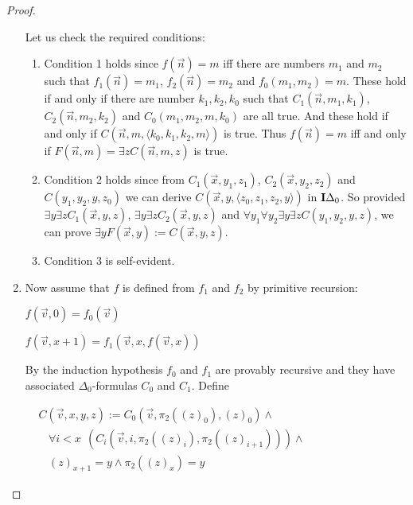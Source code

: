 \documentclass[8pt]{article}
\theoremstyle{definition}
\theoremstyle{definition}
\theoremstyle{definition}
\theoremstyle{definition}
\theoremstyle{definition}
\theoremstyle{definition}
\theoremstyle{definition}
\theoremstyle{definition}
\theoremstyle{definition}
\theoremstyle{definition}
\theoremstyle{definition}
\theoremstyle{definition}
\theoremstyle{definition}
\theoremstyle{question}
\begin{document}
\begin{proof}
\begin{enumerate}
    Let us check the required conditions:
    \begin{enumerate}
      \item Condition 1 holds since $f(\vec{n}) = m$ iff there are numbers $m_1$ and $m_2$ such that
      $f_1(\vec{n}) = m_1$, $f_2(\vec{n}) = m_2$ and $f_0(m_1, m_2) = m$.
      These hold if and only if there are number $k_1, k_2, k_0$ such that 
      $C_1(\vec{n}, m_1, k_1)$, $C_2(\vec{n}, m_2, k_2)$ and $C_0(m_1, m_2, m, k_0)$ are all true.
      And these hold if and only if $C(\vec{n}, m, \langle k_0, k_1, k_2, m \rangle)$ is true.
      Thus $f(\vec{n}) = m $ iff and only if $F(\vec{n}, m) = \exists z C(\vec{n}, m, z)$ is true.
      \item Condition 2 holds since from $C_1(\vec{x}, y_1, z_1)$, $C_2(\vec{x}, y_2, z_2)$
      and $C(y_1, y_2, y, z_0)$ we can derive 
      $C(\vec{x}, y, \langle z_0, z_1, z_2, y \rangle)$ in ${\bf I}\Delta_0$.
      So provided $\exists y \exists z C_1(\vec{x}, y, z)$, $\exists y \exists z C_2(\vec{x}, y, z)$ and
      $\forall y_1 \forall y_2 \exists y \exists z C(y_1, y_2, y, z)$, we can prove $\exists y F(\vec{x}, y) := 
      C(\vec{x}, y, z)$.
      \item Condition 3 is self-evident.
    \end{enumerate}
    \item Now assume that $f$ is defined from $f_1$ and $f_2$ by primitive recursion:
    \begin{center}
      $f(\vec{v}, 0) = f_0(\vec{v})$

      $f(\vec{v}, x + 1) = f_1(\vec{v}, x, f(\vec{v}, x))$
    \end{center}
    By the induction hypothesis $f_0$ and $f_1$ are provably recursive and they have associated $\Delta_0$-formulas
    $C_0$ and $C_1$. Define
    \begin{center}
    $\begin{array}{lll}
      & C(\vec{v}, x, y, z) := C_0(\vec{v}, \pi_2((z)_0), (z)_0) \land & \\
      & \:\:\:\: \forall i < x \:\: (C_i (\vec{v}, i, \pi_2((z)_i), \pi_2((z)_{i + 1}))) \land & \\
      & \:\:\:\: (z)_{x + 1} = y \land \pi_2((z)_x) = y &
    \end{array}$
  \end{center}


\end{enumerate}
\end{proof}
\end{document}
